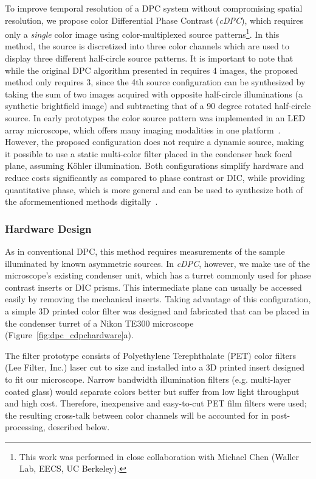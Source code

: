 To improve temporal resolution of a DPC system without compromising spatial resolution, we propose color Differential Phase Contrast (\textit{cDPC}), which requires only a \emph{single} color image using color-multiplexed source patterns\footnote{This work was performed in close collaboration with Michael Chen (Waller Lab, EECS, UC Berkeley).}. In this method, the source is discretized into three color channels which are used to display three different half-circle source patterns. It is important to note that while the original DPC algorithm presented in \cite{tian2015quantitative} requires 4 images, the proposed method only requires 3, since the 4th source configuration can be synthesized by taking the sum of two images acquired with opposite half-circle illuminations (a synthetic brightfield image) and subtracting that of a 90 degree rotated half-circle source. In early prototypes the color source pattern was implemented in an LED array microscope, which offers many imaging modalities in one platform~\cite{Tian14,zijiMulti,tian2015quantitative,Ma:15,phillips2015multi, Zheng2011, Zheng2013}. However, the proposed configuration does not require a dynamic source, making it possible to use a static multi-color filter placed in the condenser back focal plane, assuming K\"{o}hler illumination. Both configurations simplify hardware and reduce costs significantly as compared to phase contrast or DIC, while providing quantitative phase, which is more general and can be used to synthesize both of the aformementioned methods digitally~\cite{JMI:JMI1027}.

\subsubsection{Hardware Design}
As in conventional DPC, this method requires measurements of the sample illuminated by known asymmetric sources. In \textit{cDPC}, however, we make use of the microscope's existing condenser unit, which has a turret commonly used for phase contrast inserts or DIC prisms. This intermediate plane can usually be accessed easily by removing the mechanical inserts. Taking advantage of this configuration, a simple 3D printed color filter was designed and fabricated that can be placed in the condenser turret of a Nikon TE300 microscope (Figure~\ref{fig:dpc_cdpchardware}a).

The filter prototype consists of Polyethylene Terephthalate (PET) color filters (Lee Filter, Inc.) laser cut to size and installed into a 3D printed insert designed to fit our microscope. Narrow bandwidth illumination filters (e.g. multi-layer coated glass) would separate colors better but suffer from low light throughput and high cost. Therefore, inexpensive and easy-to-cut PET film filters were used; the resulting cross-talk between color channels will be accounted for in post-processing, described below.

